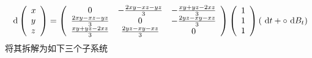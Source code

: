 \begin{equation}\label{eq6.9}
\text{ d}\left(\begin{array}{l}
	x \\
	y \\
	z
\end{array}\right)=\left(\begin{array}{ccc}
	0 & -\frac{2 x y-x z-y z}{3} & -\frac{x y+y z-2 x z}{3} \\
	\frac{2 x y-x z-y z}{3} & 0 & -\frac{2 y z-x y-x z}{3} \\
	\frac{x y+y z-2 x z}{3} & \frac{2 y z-x y-x z}{3} & 0
\end{array}\right)\left(\begin{array}{l}
	1 \\
	1 \\
	1
\end{array}\right)(\text{ d} t + \circ  \text{ d} B_t)
\end{equation}
将其拆解为如下三个子系统
